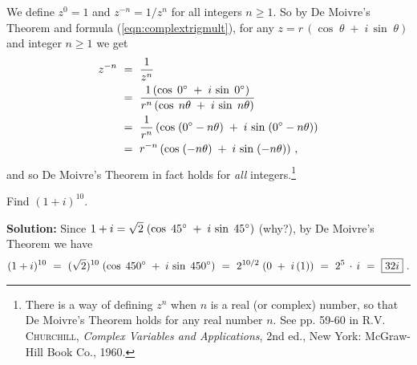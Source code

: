 We define $z^0 = 1$ and $z^{-n} = 1/z^n$ for all integers $n \ge 1$. So by De Moivre's Theorem
and formula (\ref{eqn:complextrigmult}), for any $z=r\,(\cos\;\theta \;+\; i\,\sin\;\theta)$ and
integer $n \ge 1$ we get
\begin{align*}
 z^{-n} ~&=~ \frac{1}{z^n}\\
 &=~ \frac{1\,(\cos\;0^\circ \;+\; i\,\sin\;0^\circ )}{r^n \,(\cos\;n\theta \;+\;
  i\,\sin\;n\theta )}\\
 &=~ \frac{1}{r^n} \,(\cos\;(0^\circ - n\theta) \;+\; i\,\sin\;(0^\circ - n\theta))\\
 &=~ r^{-n} \, (\cos\;(- n\theta) \;+\; i\,\sin\;(- n\theta)) ~,
\end{align*}
and so De Moivre's Theorem in fact holds for \emph{all} integers.\footnote{There is a way of
defining $z^n$ when $n$ is a real (or complex) number, so that De Moivre's Theorem holds for any
real number $n$. See pp. 59-60 in \textsc{R.V. Churchill}, \emph{Complex Variables and
Applications}, 2nd ed., New York: McGraw-Hill Book Co., 1960.}
\newpage
\begin{exmp}
 Find $(1+i)^{10}$.\vspace{1mm}
 \par\noindent\textbf{Solution:} Since $1+i = \sqrt{2}\;(\cos\;45^\circ \;+\; i\,\sin\;45^\circ )$
 (why?), by De Moivre's Theorem we have
 \begin{displaymath}
  (1+i)^{10} ~=~ (\sqrt{2})^{10} \;(\cos\;450^\circ \;+\; i\,\sin\;450^\circ ) ~=~
  2^{10/2} \;(0 \;+\; i\,(1)) ~=~ 2^5 \,\cdot\, i ~=~ \boxed{32i} ~.
 \end{displaymath}
\end{exmp}
\divider
\vspace{1mm}

